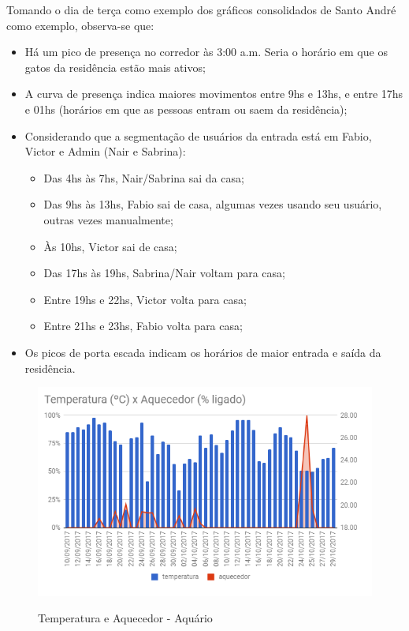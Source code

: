Tomando o dia de terça como exemplo dos gráficos consolidados de Santo André como exemplo, observa-se que:

\begin{itemize}
	\item Há um pico de presença no corredor às 3:00 a.m. Seria o horário em que os gatos da
	residência estão mais ativos;
	\item A curva de presença indica maiores movimentos entre 9hs e 13hs, e entre 17hs e 01hs (horários em que as pessoas entram ou saem da residência);
	\item Considerando que a segmentação de usuários da entrada está em Fabio, Victor e Admin (Nair e Sabrina):
	\begin{itemize}
		\item Das 4hs às 7hs, Nair/Sabrina sai da casa;
		\item Das 9hs às 13hs, Fabio sai de casa, algumas vezes usando seu usuário, outras vezes manualmente;
		\item Às 10hs, Victor sai de casa;
		\item Das 17hs às 19hs, Sabrina/Nair voltam para casa;
		\item Entre 19hs e 22hs, Victor volta para casa;
		\item Entre 21hs e 23hs, Fabio volta para casa;
	\end{itemize}
	\item Os picos de porta escada indicam os horários de maior entrada e saída da residência.
\end{itemize}

\begin{figure}[H]
	\centering
	\caption{Temperatura e Aquecedor - Aquário}
	\includegraphics[width=1.0\textwidth]{TempAquecedorAqua}
	\label{fig:TempAquecedorAqua}
\end{figure}

